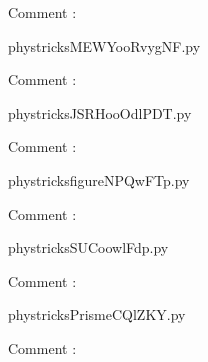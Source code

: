     Comment : 

    \clearpage
    


    \newcommand{\CaptionFigMEWYooRvygNF}{<+Type your caption here+>}
    \begin{center}
        
    \end{center}
    phystricksMEWYooRvygNF.py

    Comment : 

    \clearpage
    


    \newcommand{\CaptionFigJSRHooOdlPDT}{<+Type your caption here+>}
    \begin{center}
        
    \end{center}
    phystricksJSRHooOdlPDT.py

    Comment : 

    \clearpage
    


    \newcommand{\CaptionFigfigureNPQwFTp}{<+Type your caption here+>}
    \begin{center}
        
    \end{center}
    phystricksfigureNPQwFTp.py

    Comment : 

    \clearpage
    


    \newcommand{\CaptionFigSUCoowlFdp}{<+Type your caption here+>}
    \begin{center}
        
    \end{center}
    phystricksSUCoowlFdp.py

    Comment : 

    \clearpage
    


    \newcommand{\CaptionFigPrismeCQlZKY}{<+Type your caption here+>}
    \begin{center}
        
    \end{center}
    phystricksPrismeCQlZKY.py

    Comment : 

    \clearpage
    

